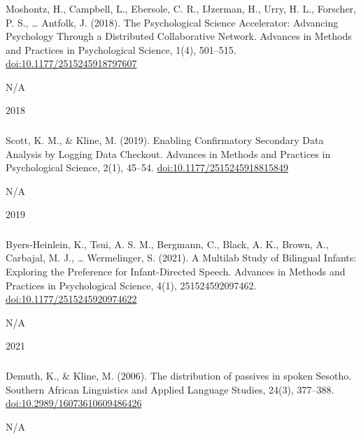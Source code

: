 \documentclass[
]{article}
\begin{document}
\hypertarget{section-7}{%
\subsubsection{}\label{section-7}}

Moshontz, H., Campbell, L., Ebersole, C. R., IJzerman, H., Urry, H. L.,
Forscher, P. S., \ldots{} Antfolk, J. (2018). The Psychological Science
Accelerator: Advancing Psychology Through a Distributed Collaborative
Network. Advances in Methods and Practices in Psychological Science,
1(4), 501--515. \url{doi:10.1177/2515245918797607}

N/A

2018

\hypertarget{section-8}{%
\subsubsection{}\label{section-8}}

Scott, K. M., \& Kline, M. (2019). Enabling Confirmatory Secondary Data
Analysis by Logging Data Checkout. Advances in Methods and Practices in
Psychological Science, 2(1), 45--54. \url{doi:10.1177/2515245918815849}

N/A

2019

\hypertarget{section-9}{%
\subsubsection{}\label{section-9}}

Byers-Heinlein, K., Tsui, A. S. M., Bergmann, C., Black, A. K., Brown,
A., Carbajal, M. J., \ldots{} Wermelinger, S. (2021). A Multilab Study
of Bilingual Infants: Exploring the Preference for Infant-Directed
Speech. Advances in Methods and Practices in Psychological Science,
4(1), 251524592097462. \url{doi:10.1177/2515245920974622}

N/A

2021

\hypertarget{section-10}{%
\subsubsection{}\label{section-10}}

Demuth, K., \& Kline, M. (2006). The distribution of passives in spoken
Sesotho. Southern African Linguistics and Applied Language Studies,
24(3), 377--388. \url{doi:10.2989/16073610609486426}

N/A
\end{document}
